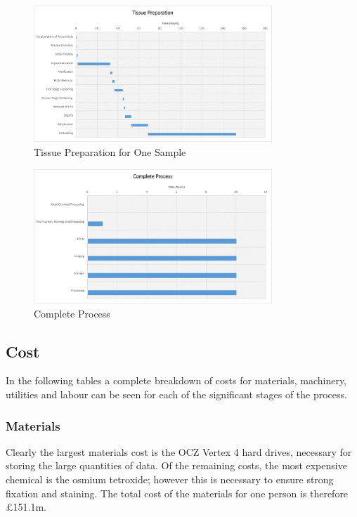 \documentclass[a4paper, 11pt]{article}
\numberwithin{equation}{section}
\begin{document}
\label{timescale}
\begin{figure}[H]
\centering
\includegraphics[width=0.80\textwidth]{tissueprep.png}
\caption{\label{fig:tissueprep} Tissue Preparation for One Sample}
\end{figure}	

\begin{figure}[H]
\centering
\includegraphics[width=0.80\textwidth]{Completeprocess.png}
\caption{\label{fig:tissueprep} Complete Process}
\end{figure}	


\subsection{Cost}

In the following tables a complete breakdown of costs for materials, machinery, utilities and labour can be seen for each of the significant stages of the process. 

\subsubsection{Materials}

Clearly the largest materials cost is the OCZ Vertex 4 hard drives, necessary for storing the large quantities of data. Of the remaining costs, the most expensive chemical is the osmium tetroxide; however this is necessary to ensure strong fixation and staining. The total cost of the materials for one person is therefore \pounds 151.1m.
\end{document}
